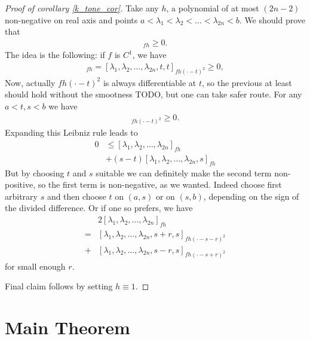 \begin{proof}[Proof of corollary \ref{k_tone_cor}]
	Take any $h$, a polynomial of at most $(2 n - 2)$ non-negative on real axis and points $a < \lambda_{1} < \lambda_{2} < \ldots < \lambda_{2 n} < b$. We should prove that
	\begin{align*}
		[\lambda_{1}, \lambda_{2}, \ldots, \lambda_{2 n}]_{f h} \geq 0.
	\end{align*}
	The idea is the following: if $f$ is $C^{1}$, we have
	\begin{align*}
		[\lambda_{1}, \lambda_{2}, \ldots, \lambda_{2 n}]_{f h} = [\lambda_{1}, \lambda_{2}, \ldots, \lambda_{2 n}, t, t]_{f h (\cdot - t)^2} \geq 0,
	\end{align*}
	Now, actually $f h (\cdot - t)^2$ is always differentiable at $t$, so the previous at least should hold without the smootness TODO, but one can take safer route.
	For any $a < t, s < b$ we have
	\begin{align*}
		[\lambda_{1}, \lambda_{2}, \ldots, \lambda_{2 n}, t, s]_{f h (\cdot - t)^2} \geq 0.
	\end{align*}
	Expanding this Leibniz rule leads to
	\begin{align*}
		0 &\leq [\lambda_{1}, \lambda_{2}, \ldots, \lambda_{2 n}]_{f h} \\
		&+ (s - t) [\lambda_{1}, \lambda_{2}, \ldots, \lambda_{2 n}, s]_{f h}
	\end{align*}
	But by choosing $t$ and $s$ suitable we can definitely make the second term non-positive, so the first term is non-negative, as we wanted. Indeed choose first arbitrary $s$ and then choose $t$ on $(a, s)$ or on $(s, b)$, depending on the sign of the divided difference. Or if one so prefers, we have
	\begin{align*}
		& 2 [\lambda_{1}, \lambda_{2}, \ldots, \lambda_{2 n}]_{f h} \\
		=& [\lambda_{1}, \lambda_{2}, \ldots, \lambda_{2 n}, s + r, s]_{f h (\cdot - s - r)^2} \\
		+& [\lambda_{1}, \lambda_{2}, \ldots, \lambda_{2 n}, s - r, s]_{f h (\cdot - s + r)^2}
	\end{align*}
	for small enough $r$.

	Final claim follows by setting $h \equiv 1$.
\end{proof}

\section{Main Theorem}

